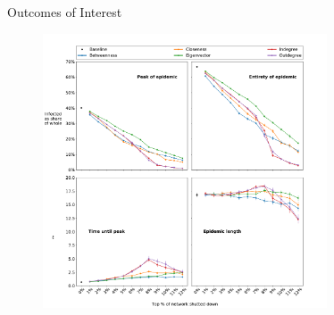 \documentclass[10pt]{beamer}
\begin{document}
\begin{frame}{Outcomes of Interest}
\begin{figure}
\begin{center}
    \includegraphics[width=0.75\textwidth]{Figures/interest_outcomes.pdf}
\end{center}
\end{figure}
\end{frame}


     
     
\end{document}

